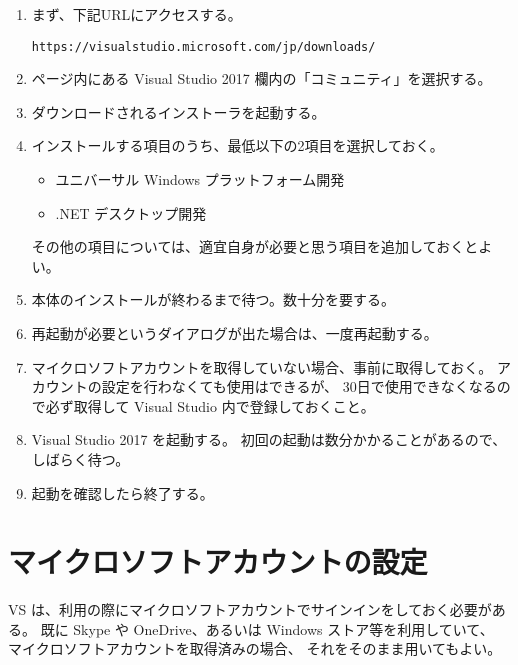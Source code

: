 \documentclass[a4paper]{jsarticle}
\begin{document}
\begin{enumerate}
 \item まず、下記URLにアクセスする。
  \begin{screen}
  \begin{center}
	\verb+https://visualstudio.microsoft.com/jp/downloads/+
  \end{center}
  \end{screen}

 \item ページ内にある Visual Studio 2017 欄内の「コミュニティ」を選択する。

 \item ダウンロードされるインストーラを起動する。

 \item インストールする項目のうち、最低以下の2項目を選択しておく。
	\begin{itemize}
	 \item ユニバーサル Windows プラットフォーム開発
	 \item .NET デスクトップ開発
	\end{itemize}
	その他の項目については、適宜自身が必要と思う項目を追加しておくとよい。

 \item 本体のインストールが終わるまで待つ。数十分を要する。

 \item 再起動が必要というダイアログが出た場合は、一度再起動する。

 \item マイクロソフトアカウントを取得していない場合、事前に取得しておく。
	アカウントの設定を行わなくても使用はできるが、
	30日で使用できなくなるので必ず取得して Visual Studio 内で登録しておくこと。

 \item Visual Studio 2017 を起動する。
	初回の起動は数分かかることがあるので、しばらく待つ。

 \item 起動を確認したら終了する。

\end{enumerate}

\section{マイクロソフトアカウントの設定}

VS は、利用の際にマイクロソフトアカウントでサインインをしておく必要がある。
既に Skype や OneDrive、あるいは Windows ストア等を利用していて、
マイクロソフトアカウントを取得済みの場合、
それをそのまま用いてもよい。
\end{document}
